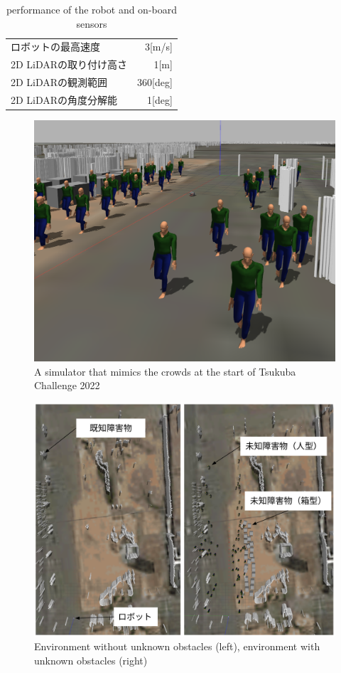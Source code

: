 \documentclass{jarticle}
\begin{document}
\begin{table}[hbtp]
  \caption{performance of the robot and on-board sensors}
  \label{table:ロボットおよび搭載しているセンサの性能}
  \centering
  \begin{tabular}{lr}
    \hline
    \small{ロボットの最高速度}      & \small{3[m/s]} \\
    \small{2D LiDARの取り付け高さ}  & \small{1[m]} \\
    \small{2D LiDARの観測範囲}      & \small{360[deg]} \\
    \small{2D LiDARの角度分解能}    & \small{1[deg]} \\
    \hline
  \end{tabular}
\end{table}

\begin{figure}[htbp]
  \centering
   \includegraphics[width=0.8\linewidth]{fig/hitogomi_gazebo.png}
   \vspace*{-4mm}
   \caption{A simulator that mimics the crowds at the start of Tsukuba Challenge 2022}
   \label{fig:人混みガゼボ}
\end{figure}

\begin{figure}[htbp]
  \centering
   \includegraphics[width=0.8\linewidth]{fig/environment_comparison.png}
   \vspace*{-4mm}
   \caption{Environment without unknown obstacles (left), environment with unknown obstacles (right)}
   \label{fig:つくばチャレンジ人混みシミュレータ}
\end{figure}
\end{document}
